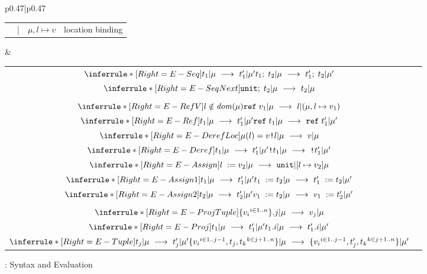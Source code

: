 \begin{figure}[h]
\begin{tabular}{p{}|p{}}
\begin{tabular}{r@{\hspace{0.5em}}r@{\hspace{0.5em}}l@{\hspace{0.5em}}r}
            & |   & $\mu, l \mapsto v$          & location binding    \\
    \end{tabular}
    &
    \renewcommand{\arraystretch}{2.5}
    \begin{tabular}{cr}
        $\inferrule*[Right=E-Seq] 
            {t_1 | \mu\ \longrightarrow\ t'_1 | \mu'}
            {\seq{t_1}{t_2} | \mu\ \longrightarrow\ \seq{t'_1}{t_2} | \mu'}$ & \\
        $\inferrule*[Right=E-SeqNext] 
            { }
            {\seq{\unit}{t_2} | \mu\ \longrightarrow\ t_2 | \mu}$ & \\
         & \\
        $\inferrule*[Right=E-RefV] 
            {l \notin \mathit{dom}(\mu)}
            {\refr{v_1} | \mu\ \longrightarrow\ l | (\mu, l \mapsto v_1)}$ & \\
        $\inferrule*[Right=E-Ref] 
            {t_1 | \mu\ \longrightarrow\ t'_1 | \mu'}
            {\refr{t_1} | \mu\ \longrightarrow\ \refr{t'_1} | \mu'}$ & \\
        $\inferrule*[Right=E-DerefLoc] 
            {\mu(l) = v}
            {\deref{l} | \mu\ \longrightarrow\ v | \mu}$ & \\
        $\inferrule*[Right=E-Deref] 
            {t_1 | \mu\ \longrightarrow\ t'_1 | \mu'}
            {\deref{t_1} | \mu\ \longrightarrow\ \deref{t'_1} | \mu'}$ & \\
        $\inferrule*[Right=E-Assign] 
            { }
            {\assign{l}{v_2} | \mu\ \longrightarrow\ \unit | [l \mapsto v_2]\mu}$ & \\
        $\inferrule*[Right=E-Assign1] 
            {t_1 | \mu\ \longrightarrow\ t'_1 | \mu'}
            {\assign{t_1}{t_2} | \mu\ \longrightarrow\ \assign{t'_1}{t_2} | \mu'}$ & \\
        $\inferrule*[Right=E-Assign2] 
            {t_2 | \mu\ \longrightarrow\ t'_2 | \mu'}
            {\assign{v_1}{t_2} | \mu\ \longrightarrow\ \assign{v_1}{t'_2} | \mu'}$ & \\
         & \\
        $\inferrule*[Right=E-ProjTuple] 
            { }
            {\proj{\Tuple{{v_i}^{i\in 1..n}}}{j} | \mu\ \longrightarrow\ v_j | \mu}$ & \\
        $\inferrule*[Right=E-Proj] 
            {t_1 | \mu\ \longrightarrow\ t'_1 | \mu'}
            {\proj{t_1}{i} | \mu\ \longrightarrow\ \proj{t'_1}{i} | \mu'}$ & \\
        $\inferrule*[Right=E-Tuple] 
            {t_j | \mu\ \longrightarrow\ t'_j | \mu'}
            {\Tuple{{v_i}^{i\in 1..j-1}, t_j, {t_k}^{k\in j+1..n}} | \mu \\
               \ \longrightarrow\ \Tuple{{v_i}^{i\in 1..j-1}, t'_j, {t_k}^{k\in j+1..n}} | \mu'}$ & \\
    \end{tabular}
\end{tabular}
\caption{: Syntax and Evaluation}
\label{fig:language-definition-typedlambdaref}
\end{figure}





